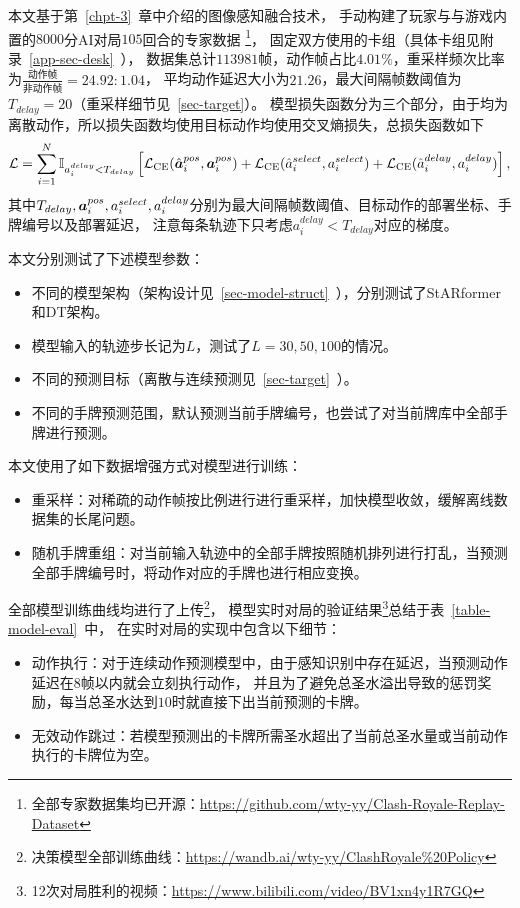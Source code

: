 \label{sec-decision-model}
本文基于第~\ref{chpt-3}~章中介绍的图像感知融合技术，
手动构建了玩家与与游戏内置的$8000$分AI对局$105$回合的专家数据
\footnote{全部专家数据集均已开源：\url{https://github.com/wty-yy/Clash-Royale-Replay-Dataset}}，
固定双方使用的卡组（具体卡组见附录~\ref{app-sec-desk}~），
数据集总计$113981$帧，动作帧占比$4.01\%$，重采样频次比率为$\frac{\text{动作帧}}{\text{非动作帧}}=24.92:1.04$，
平均动作延迟大小为$21.26$，最大间隔帧数阈值为$T_{delay}=20$（重采样细节见~\ref{sec-target}）。
模型损失函数分为三个部分，由于均为离散动作，所以损失函数均使用目标动作均使用交叉熵损失，总损失函数如下
\begin{equation}
  \mathcal{L} =
  \sum_{\substack{i=1\\}}^N\mathbb{I}_{a_i^{delay} < T_{delay}}\left[\mathcal{L}_{\text{CE}}(\hat{\boldsymbol{a}}_i^{pos}, \boldsymbol{a}_i^{pos})+
  \mathcal{L}_{\text{CE}}(\hat{a}_i^{select}, a_i^{select}) + 
  \mathcal{L}_{\text{CE}}(\hat{a}_i^{delay}, a_i^{delay})\right],
\end{equation}
其中$T_{delay},\boldsymbol{a}_i^{pos},a_i^{select},a_i^{delay}$分别为最大间隔帧数阈值、目标动作的部署坐标、手牌编号以及部署延迟，
注意每条轨迹下只考虑$a_i^{delay} < T_{delay}$对应的梯度。

本文分别测试了下述模型参数：
\begin{itemize}
  \item 不同的模型架构（架构设计见~\ref{sec-model-struct}~），分别测试了StARformer和DT架构。
  \item 模型输入的轨迹步长记为$L$，测试了$L=30,50,100$的情况。
  \item 不同的预测目标（离散与连续预测见~\ref{sec-target}~）。
  \item 不同的手牌预测范围，默认预测当前手牌编号，也尝试了对当前牌库中全部手牌进行预测。
\end{itemize}

本文使用了如下数据增强方式对模型进行训练：
\begin{itemize}
  \item 重采样：对稀疏的动作帧按比例进行进行重采样，加快模型收敛，缓解离线数据集的长尾问题。
  \item 随机手牌重组：对当前输入轨迹中的全部手牌按照随机排列进行打乱，当预测全部手牌编号时，将动作对应的手牌也进行相应变换。
\end{itemize}

全部模型训练曲线均进行了上传\footnote{决策模型全部训练曲线：\url{https://wandb.ai/wty-yy/ClashRoyale\%20Policy}}，
模型实时对局的验证结果\footnote{12次对局胜利的视频：\url{https://www.bilibili.com/video/BV1xn4y1R7GQ}}总结于表~\ref{table-model-eval}~中，
在实时对局的实现中包含以下细节：
\begin{itemize}
  \item 动作执行：对于连续动作预测模型中，由于感知识别中存在延迟，当预测动作延迟在$8$帧以内就会立刻执行动作，
  并且为了避免总圣水溢出导致的惩罚奖励，每当总圣水达到$10$时就直接下出当前预测的卡牌。
  \item 无效动作跳过：若模型预测出的卡牌所需圣水超出了当前总圣水量或当前动作执行的卡牌位为空。
\end{itemize}

